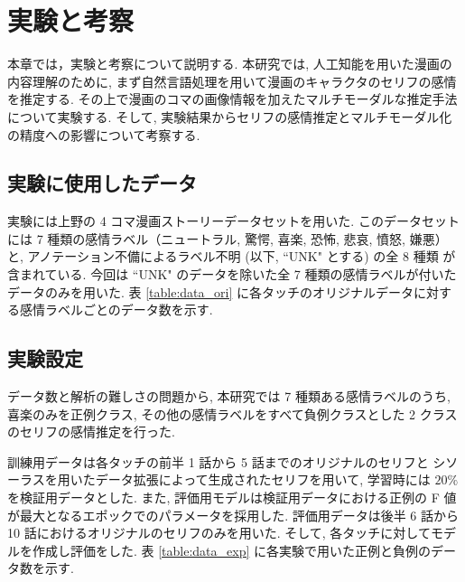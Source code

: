 \newpage
\changeindent{0cm}
\section{実験と考察}
\changeindent{2cm}

本章では，実験と考察について説明する.
本研究では, 人工知能を用いた漫画の内容理解のために,
まず自然言語処理を用いて漫画のキャラクタのセリフの感情を推定する.
その上で漫画のコマの画像情報を加えたマルチモーダルな推定手法について実験する.
そして, 実験結果からセリフの感情推定とマルチモーダル化の精度への影響について考察する.

\changeindent{0cm}
\subsection{実験に使用したデータ}
\changeindent{2cm}

実験には上野の 4 コマ漫画ストーリーデータセットを用いた. このデータセットには 7 種類の感情ラベル（ニュートラル, 驚愕, 喜楽, 恐怖, 悲哀, 憤怒, 嫌悪）と, アノテーション不備によるラベル不明 (以下, ``UNK" とする) の全 8 種類
が含まれている. 今回は ``UNK" のデータを除いた全 7 種類の感情ラベルが付いたデータのみを用いた. 表 \ref{table:data_ori} に各タッチのオリジナルデータに対する感情ラベルごとのデータ数を示す.

\changeindent{0cm}
\subsection{実験設定}
\changeindent{2cm}

データ数と解析の難しさの問題から, 本研究では 7 種類ある感情ラベルのうち,
喜楽のみを正例クラス, その他の感情ラベルをすべて負例クラスとした
2 クラスのセリフの感情推定を行った.

訓練用データは各タッチの前半 1 話から 5 話までのオリジナルのセリフと
シソーラスを用いたデータ拡張によって生成されたセリフを用いて, 学習時には $20\%$ を検証用データとした.
また, 評価用モデルは検証用データにおける正例の F 値が最大となるエポックでのパラメータを採用した.
評価用データは後半 6 話から 10 話におけるオリジナルのセリフのみを用いた. そして, 各タッチに対してモデルを作成し評価をした.
表 \ref{table:data_exp} に各実験で用いた正例と負例のデータ数を示す.



